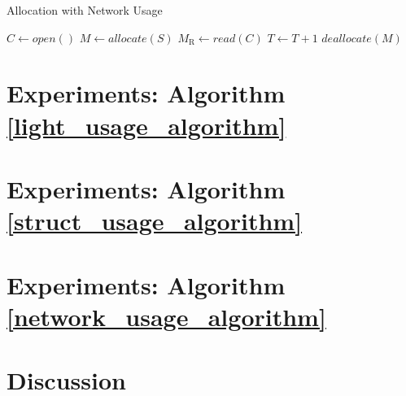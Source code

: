 \documentclass[letterpaper, 10 pt, conference]{ieeeconf}  %
\begin{document}
\begin{algorithm}[h]
  \caption{Allocation with Network Usage}
  \begin{algorithmic}
    \STATE $C \leftarrow open()$
      \STATE $M \leftarrow allocate(S)$
      \STATE $M_\text{R} \leftarrow read(C)$
      \STATE $T \leftarrow T + 1$
      \STATE $deallocate(M)$
    \ENDWHILE
  \end{algorithmic}
  \label{network_usage_algorithm}
\end{algorithm}

\section{Experiments: Algorithm \ref{light_usage_algorithm}}

\section{Experiments: Algorithm \ref{struct_usage_algorithm}}

\section{Experiments: Algorithm \ref{network_usage_algorithm}}

\section{Discussion}

\end{document}
